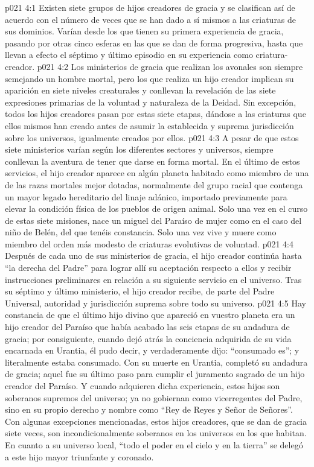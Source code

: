 \vs p021 4:1 Existen siete grupos de hijos creadores de gracia y se clasifican así de acuerdo con el número de veces que se han dado a sí mismos a las criaturas de sus dominios. Varían desde los que tienen su primera experiencia de gracia, pasando por otras cinco esferas en las que se dan de forma progresiva, hasta que llevan a efecto el séptimo y último episodio en su experiencia como criatura\hyp{}creador.
\vs p021 4:2 Los ministerios de gracia que realizan los avonales son siempre semejando un hombre mortal, pero los que realiza un hijo creador implican su aparición en siete niveles creaturales y conllevan la revelación de las siete expresiones primarias de la voluntad y naturaleza de la Deidad. Sin excepción, todos los hijos creadores pasan por estas siete etapas, dándose a las criaturas que ellos mismos han creado antes de asumir la establecida y suprema jurisdicción sobre los universos, igualmente creados por ellos.
\vs p021 4:3 A pesar de que estos siete ministerios varían según los diferentes sectores y universos, siempre conllevan la aventura de tener que darse en forma mortal. En el último de estos servicios, el hijo creador aparece en algún planeta habitado como miembro de una de las razas mortales mejor dotadas, normalmente del grupo racial que contenga un mayor legado hereditario del linaje adánico, importado previamente para elevar la condición física de los pueblos de origen animal. Solo una vez en el curso de estas siete misiones, nace un miguel del Paraíso de mujer como en el caso del niño de Belén, del que tenéis constancia. Solo una vez vive y muere como miembro del orden más modesto de criaturas evolutivas de voluntad.
\vs p021 4:4 Después de cada uno de sus ministerios de gracia, el hijo creador continúa hasta “la derecha del Padre” para lograr allí su aceptación respecto a ellos y recibir instrucciones preliminares en relación a su siguiente servicio en el universo. Tras su séptimo y último ministerio, el hijo creador recibe, de parte del Padre Universal, autoridad y jurisdicción suprema sobre todo su universo.
\vs p021 4:5 \pc Hay constancia de que el último hijo divino que apareció en vuestro planeta era un hijo creador del Paraíso que había acabado las seis etapas de su andadura de gracia; por consiguiente, cuando dejó atrás la conciencia adquirida de su vida encarnada en Urantia, él pudo decir, y verdaderamente dijo: “consumado es”; y literalmente estaba consumado. Con su muerte en Urantia, completó su andadura de gracia; aquel fue su último paso para cumplir el juramento sagrado de un hijo creador del Paraíso. Y cuando adquieren dicha experiencia, estos hijos son soberanos supremos del universo; ya no gobiernan como vicerregentes del Padre, sino en su propio derecho y nombre como “Rey de Reyes y Señor de Señores”. Con algunas excepciones mencionadas, estos hijos creadores, que se dan de gracia siete veces, son incondicionalmente soberanos en los universos en los que habitan. En cuanto a su universo local, “todo el poder en el cielo y en la tierra” se delegó a este hijo mayor triunfante y coronado.
